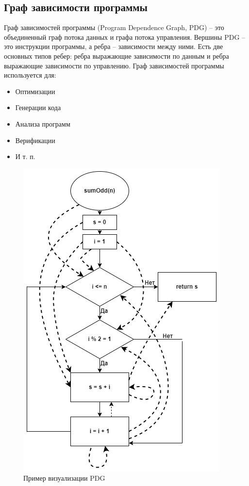 \subsection{Граф зависимости программы} \label{ch1:subsec-title-abbr}
Граф зависимостей программы (Program Dependence Graph, PDG) – это объединенный граф потока данных и графа потока управления. Вершины PDG – это инструкции программы, а ребра – зависимости между ними. Есть две основных типов ребер: ребра выражающие зависимости по данным и ребра выражающие зависимости по управлению.
Граф зависимостей программы используется для:
\begin{itemize}
\item Оптимизации
\item Генерации кода
\item Анализа программ
\item Верификации
\item И т. п.
\end{itemize}	
\begin{figure}[h]
	\center
	\includegraphics [scale=0.7] {my_folder/images/my/5}
	\caption{Пример визуализации PDG}
	\label{fig:5}  
\end{figure}
